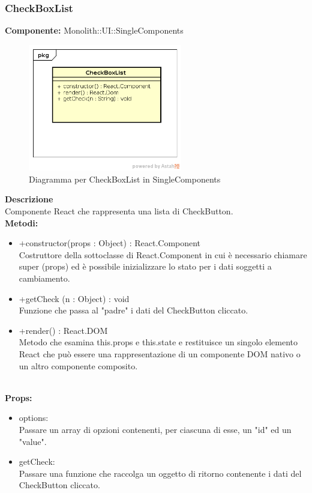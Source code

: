 \subsubsection{CheckBoxList}
\textbf{Componente:}  Monolith::UI::SingleComponents\\
   \FloatBarrier
   \begin{figure}[ht]
   \centering
   \includegraphics[width=0.6\textwidth]{img/single-CheckBoxList}
   \caption{{Diagramma per CheckBoxList in SingleComponents}}
\end{figure}
\FloatBarrier
\textbf{Descrizione}\\
Componente React che rappresenta una lista di CheckButton. \\
\textbf{Metodi:} 
\begin{itemize}
\item +constructor(props : Object) : React.Component 
\\
Costruttore della sottoclasse di React.Component in cui è necessario chiamare super (props) ed è possibile inizializzare lo stato per i dati soggetti a cambiamento.

\item +getCheck (n : Object) : void \\
Funzione che passa al "padre" i dati del CheckButton cliccato. 

\item +render() : React.DOM 
\\
Metodo che esamina this.props e this.state e restituisce un singolo elemento React che può essere una rappresentazione di un componente DOM nativo o un altro componente composito.

\end{itemize}
\\
\textbf{Props:} 
\begin{itemize}
\item options: 
\\
Passare un array di opzioni contenenti, per ciascuna di esse, un "id" ed un "value".
\item getCheck: 
\\
Passare una funzione che raccolga un oggetto di ritorno contenente i dati del CheckButton cliccato.

\end{itemize} 


